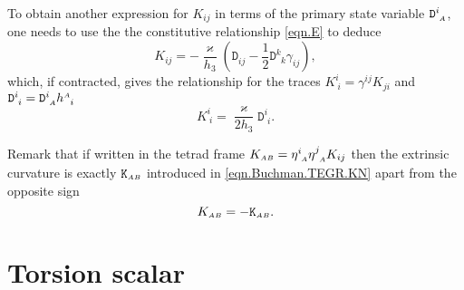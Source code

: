 \documentclass[
10pt, %
a4paper, %
oneside, %
twocolumn,
headinclude,footinclude, %
BCOR5mm, %
]{scrartcl}
\newcommand{\sA}{\mathsmaller A}
\newcommand{\sB}{\mathsmaller B}
\newcommand{\sC}{\mathsmaller C}
\newcommand{\mg}[1]{\kappa_{#1}}			%
\newcommand{\tetrsymbol}{h}
\newcommand{\itetrsymbol}{\eta}
\newcommand{\itetr}[2]{\itetrsymbol^{#1}_{\phantom{#1}#2}}
\newcommand{\tetr}[2]{\tetrsymbol^{#1}_{\phantom{#1}#2}}
\newcommand{\detTetr}{\tetrsymbol}
\newcommand{\Dfin}[2]{\mathtt{D}_{\phantom{#2}#1}^{#2}}	%
\newcommand{\Efin}[2]{\mathtt{E}^{#1}_{\phantom{#1}#2}}	%
\newcommand{\Kbuch}[2]{\mathtt{K}_{{#1}{#2}}}	%
\begin{document}
	To obtain another expression for $ K_{ij} $ in terms of the primary state variable $ 
	\Dfin{\sA}{i} 
	$, one needs to use the the constitutive relationship \eqref{eqn.E} to deduce
	\begin{equation}
		K_{ij} = -\frac{\varkappa}{\detTetr_3} 
		\left ( 
		\Dfin{ij}{} - \frac{1}{2} \Dfin{k}{k} \gamma_{ij}
		\right ) ,
	\end{equation}
	which, if contracted, gives the relationship for the traces $ K^i_{\ i} = \gamma^{ij}K_{ji} $ 
	and $ 
	\Dfin{i}{i} =  \Dfin{\sA}{i}\tetr{\sA}{i} $
	\begin{equation}
		K^i_{\ i} = \frac{\varkappa}{2\detTetr_3}\Dfin{i}{i}.
	\end{equation}
	
	Remark that if written in the tetrad frame $ K_{\sA\sB} = 
	\itetr{i}{\sA}\itetr{j}{\sA} K_{ij}$ then the extrinsic curvature is exactly $ \Kbuch{\sA}{\sB} 
	$ 
	introduced in 
	\eqref{eqn.Buchman.TEGR.KN} apart from the opposite sign
	\begin{equation}
		K_{\sA\sB} = -\Kbuch{\sA}{\sB}.
	\end{equation}  
	
	
	
	
	\section{Torsion scalar}\label{sec.closure}
	
	
	
\end{document}

